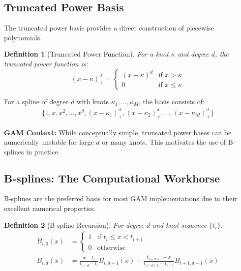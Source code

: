 \documentclass[12pt]{article}
\newtheorem{definition}{Definition}
\begin{document}
\subsection{Truncated Power Basis}

The truncated power basis provides a direct construction of piecewise polynomials.

\begin{definition}[Truncated Power Function]
For a knot $\kappa$ and degree $d$, the truncated power function is:
\begin{equation}
(x - \kappa)_+^d = \begin{cases}
(x - \kappa)^d & \text{if } x > \kappa \\
0 & \text{if } x \leq \kappa
\end{cases}
\end{equation}
\end{definition}

For a spline of degree $d$ with knots $\kappa_1, \ldots, \kappa_M$, the basis consists of:
\begin{align}
\{1, x, x^2, \ldots, x^d, (x-\kappa_1)_+^d, (x-\kappa_2)_+^d, \ldots, (x-\kappa_M)_+^d\}
\end{align}

\textbf{GAM Context:} While conceptually simple, truncated power bases can be numerically unstable for large $d$ or many knots. This motivates the use of B-splines in practice.

\subsection{B-splines: The Computational Workhorse}

B-splines are the preferred basis for most GAM implementations due to their excellent numerical properties.

\begin{definition}[B-spline Recursion]
For degree $d$ and knot sequence $\{t_i\}$:
\begin{align}
B_{i,0}(x) &= \begin{cases}
1 & \text{if } t_i \leq x < t_{i+1} \\
0 & \text{otherwise}
\end{cases} \\
B_{i,d}(x) &= \frac{x - t_i}{t_{i+d} - t_i} B_{i,d-1}(x) + \frac{t_{i+d+1} - x}{t_{i+d+1} - t_{i+1}} B_{i+1,d-1}(x)
\end{align}
\end{definition}
\end{document}
